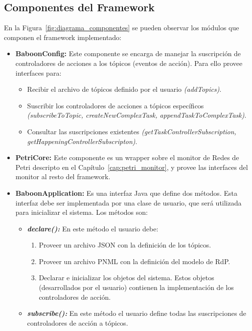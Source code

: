 \subsection{Componentes del Framework}
\label{sec:componentes_baboon}
En la Figura~\ref{fig:diagrama_componentes} se pueden observar los
módulos que componen el framework implementado:
\begin{itemize}
  \item \textbf{BaboonConfig: } Este componente se encarga de manejar la
  suscripción de controladores de acciones a los tópicos (eventos de acción).
  Para ello provee interfaces para:
	  \begin{itemize}
	    \item Recibir el archivo de tópicos definido por el usuario
	    \emph{(addTopics)}.
	    \item Suscribir los controladores de acciones a tópicos específicos
	    \emph{(subscribeToTopic, createNewComplexTask, appendTaskToComplexTask)}.
	    \item Consultar las suscripciones existentes
	    \emph{(getTaskControllerSubscription,
	    getHappeningControllerSubscripton)}.
	  \end{itemize}
	  
  \item \textbf{PetriCore: } Este componente es un wrapper sobre el monitor de
  Redes de Petri descripto en el
  Capítulo~\ref{cap:petri_monitor}, y provee las interfaces del
  monitor al resto del framework.
  
  \item \textbf{BaboonApplication: } Es una interfaz Java que define dos
  métodos. Esta interfaz debe ser implementada por una clase de usuario, que
  será utilizada para inicializar el sistema. Los métodos son:
  \begin{itemize}
    \item \textbf{\emph{declare(): }} En este método el usuario debe:
    	\begin{enumerate}
    	  \item Proveer un archivo JSON con la definición de los tópicos.
    	  \item Proveer un archivo PNML con la definición del modelo de RdP.
    	  \item Declarar e inicializar los objetos del sistema. Estos objetos
    	  (desarrollados por el usuario) contienen la implementación
    	  de los controladores de acción.
    	\end{enumerate}
    \item \textbf{\emph{subscribe(): }} En este método el usuario define todas
    las suscripciones de controladores de acción a tópicos.
   \end{itemize}
   

\end{itemize}
